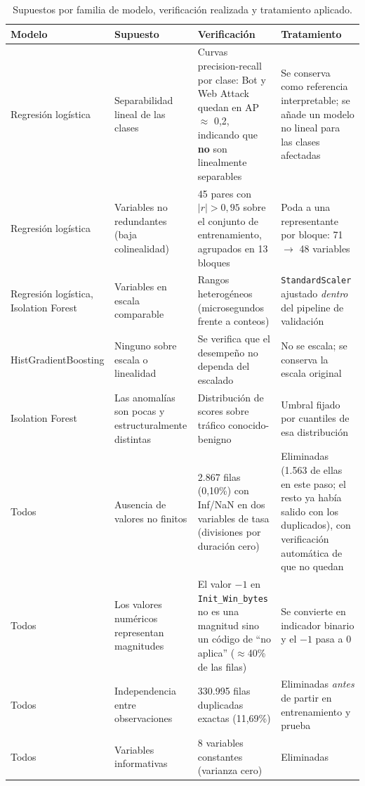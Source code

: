 \documentclass[11pt,a4paper]{article}
\begin{document}
\begin{table}[H]
\centering
\caption{Supuestos por familia de modelo, verificación realizada y tratamiento aplicado.}
\label{tab:supuestos}
\footnotesize\setlength{\tabcolsep}{4pt}
\begin{tabular}{L{2.3cm} L{3.2cm} L{4.5cm} L{4.0cm}}
\toprule
\textbf{Modelo} & \textbf{Supuesto} & \textbf{Verificación} & \textbf{Tratamiento} \\
\midrule
Regresión logística & Separabilidad lineal de las clases &
Curvas precision-recall por clase: Bot y Web Attack quedan en AP $\approx$ 0,2, indicando que \textbf{no} son linealmente separables &
Se conserva como referencia interpretable; se añade un modelo no lineal para las clases afectadas \\
Regresión logística & Variables no redundantes (baja colinealidad) &
45 pares con $|r| > 0{,}95$ sobre el conjunto de entrenamiento, agrupados en 13 bloques &
Poda a una representante por bloque: 71 $\rightarrow$ 48 variables \\
Regresión logística, Isolation Forest & Variables en escala comparable &
Rangos heterogéneos (microsegundos frente a conteos) &
\texttt{StandardScaler} ajustado \emph{dentro} del pipeline de validación \\
HistGradient\-Boosting & Ninguno sobre escala o linealidad &
Se verifica que el desempeño no dependa del escalado &
No se escala; se conserva la escala original \\
Isolation Forest & Las anomalías son pocas y estructuralmente distintas &
Distribución de scores sobre tráfico conocido-benigno &
Umbral fijado por cuantiles de esa distribución \\
Todos & Ausencia de valores no finitos &
2.867 filas (0,10\%) con Inf/NaN en dos variables de tasa (divisiones por duración cero) &
Eliminadas (1.563 de ellas en este paso; el resto ya había salido con los duplicados), con verificación automática de que no quedan \\
Todos & Los valores numéricos representan magnitudes &
El valor $-1$ en \texttt{Init\_Win\_bytes} no es una magnitud sino un código de ``no aplica'' ($\approx$40\% de las filas) &
Se convierte en indicador binario y el $-1$ pasa a 0 \\
Todos & Independencia entre observaciones &
330.995 filas duplicadas exactas (11,69\%) &
Eliminadas \emph{antes} de partir en entrenamiento y prueba \\
Todos & Variables informativas &
8 variables constantes (varianza cero) &
Eliminadas \\
\bottomrule
\end{tabular}
\end{table}
\end{document}
